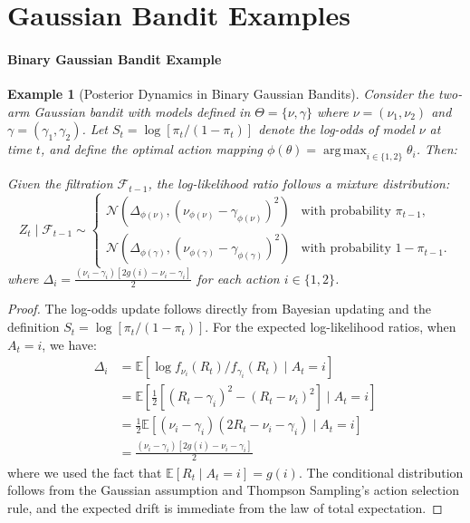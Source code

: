 \documentclass[12pt]{article}
\newtheorem{example}{Example}
\DeclareMathOperator*{\argmax}{arg\,max}
\begin{document}
\section{Gaussian Bandit Examples}
\label{app:B}

\paragraph{Binary Gaussian Bandit Example}
\label{app:B:gaussian}

\begin{example}[Posterior Dynamics in Binary Gaussian Bandits]
\label{example:binary-gaussian}
Consider the two-arm Gaussian bandit with models defined in $\Theta = \{\nu, \gamma\}$ where $\nu = (\nu_1, \nu_2)$ and $\gamma = (\gamma_1, \gamma_2)$. Let $S_t = \log[\pi_t/(1-\pi_t)]$ denote the log-odds of model $\nu$ at time $t$, and define the optimal action mapping $\phi(\theta) = \argmax_{i \in \{1,2\}} \theta_i$. Then:

Given the filtration $\mathcal{F}_{t-1}$, the log-likelihood ratio follows a mixture distribution:
\begin{equation}
        Z_t \mid \mathcal{F}_{t-1} \sim
        \begin{cases}
            \mathcal{N}(\Delta_{\phi(\nu)}, (\nu_{\phi(\nu)}-\gamma_{\phi(\nu)})^2) & \text{with probability } \pi_{t-1}, \\
            \mathcal{N}(\Delta_{\phi(\gamma)}, (\nu_{\phi(\gamma)}-\gamma_{\phi(\gamma)})^2) & \text{with probability } 1-\pi_{t-1}.
        \end{cases}
        \label{eq:log_likelihood_ratio}
\end{equation}
where $\Delta_i = \frac{(\nu_i - \gamma_i)[2g(i) - \nu_i - \gamma_i]}{2}$ for each action $i \in \{1,2\}$.
\end{example}

\begin{proof}
    The log-odds update follows directly from Bayesian updating and the definition $S_t = \log[\pi_t/(1-\pi_t)]$. For the expected log-likelihood ratios, when $A_t = i$, we have:
    \begin{align*}
    \Delta_i &= \mathbb{E}[\log f_{\nu_i}(R_t)/f_{\gamma_i}(R_t) \mid A_t = i] \\
    &= \mathbb{E}\left[\frac{1}{2}[(R_t-\gamma_i)^2 - (R_t-\nu_i)^2] \mid A_t = i\right] \\
    &= \frac{1}{2}\mathbb{E}[(\nu_i - \gamma_i)(2R_t - \nu_i - \gamma_i) \mid A_t = i] \\
    &= \frac{(\nu_i - \gamma_i)[2g(i) - \nu_i - \gamma_i]}{2}
    \end{align*}
    where we used the fact that $\mathbb{E}[R_t \mid A_t = i] = g(i)$. The conditional distribution follows from the Gaussian assumption and Thompson Sampling's action selection rule, and the expected drift is immediate from the law of total expectation.
\end{proof}
\end{document}
